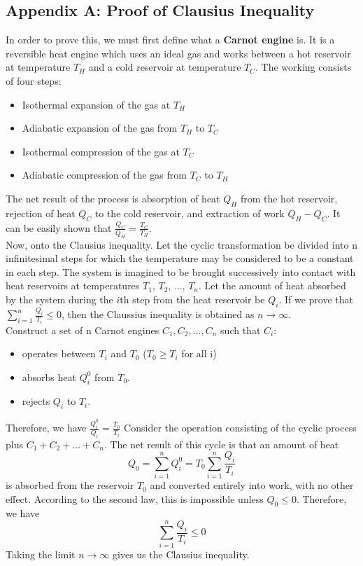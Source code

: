 \documentclass[letterpaper,10pt,english]{article}
\begin{document}
{\subsection*{Appendix A: Proof of Clausius Inequality}
In order to prove this, we must first define what a \textbf{Carnot engine} is. It is a reversible heat engine which uses an ideal gas and works between a hot reservoir at temperature $T_H$ and a cold reservoir at temperature $T_C$. The working consists of four steps:
\begin{itemize}
\item Isothermal expansion of the gas at $T_H$
\item Adiabatic expansion of the gas from $T_H$ to $T_C$
\item Isothermal compression of the gas at $T_C$
\item Adiabatic compression of the gas from $T_C$ to $T_H$
\end{itemize}
The net result of the process is absorption of heat $Q_H$ from the hot reservoir, rejection of heat $Q_C$ to the cold reservoir, and extraction of work $Q_H-Q_C$. It can be easily shown that $\frac{Q_C}{Q_H}=\frac{T_C}{T_H}$. \\
Now, onto the Clausius inequality. Let the cyclic transformation be divided into n infinitesimal steps for which the temperature may be considered to be a constant in each step. The system is imagined to be brought successively into contact with heat reservoirs at temperatures $T_1$, $T_2$, ..., $T_n$. Let the amount of heat absorbed by the system during the $i$th step from the heat reservoir be $Q_i$. If we prove that $\sum_{i=1}^{n} \frac{Q_i}{T_i} \leq 0$, then the Claussius inequality is obtained as $n\rightarrow \infty$. \\
Construct a set of n Carnot engines ${C_1, C_2, \ldots, C_n}$ such that $C_i$:
\begin{itemize}
\item operates between $T_i$ and $T_0$ ($T_0 \geq T_i$ for all i)
\item absorbs heat $Q_i^0$ from $T_0$. 
\item rejects $Q_i$ to $T_i$. 
\end{itemize} 
Therefore, we have $\frac{Q_i^0}{Q_i}=\frac{T_0}{T_i}$
Consider the operation consisting of the cyclic process plus ${C_1+ C_2+ \ldots+ C_n}$. The net result of this cycle is that an amount of heat 
\begin{equation*}
Q_0=\sum_{i=1}^{n} Q_i^0=T_0\sum_{i=1}^{n} \frac{Q_i}{T_i}
\end{equation*}
is absorbed from the reservoir $T_0$ and converted entirely into work, with no other effect. According to the second law, this is impossible unless $Q_0 \leq 0$. Therefore, we have 
\begin{equation*}
\sum_{i=1}^{n} \frac{Q_i}{T_i} \leq 0
\end{equation*}
Taking the limit $n\rightarrow \infty$ gives us the Clausius inequality. 
}
\end{document}
